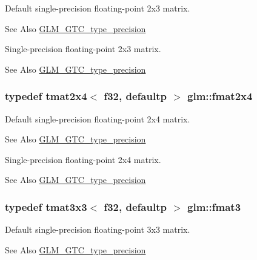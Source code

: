 Default single-\/precision floating-\/point 2x3 matrix. \begin{DoxySeeAlso}{See Also}
\hyperlink{group__gtc__type__precision}{G\-L\-M\-\_\-\-G\-T\-C\-\_\-type\-\_\-precision}
\end{DoxySeeAlso}
Single-\/precision floating-\/point 2x3 matrix. \begin{DoxySeeAlso}{See Also}
\hyperlink{group__gtc__type__precision}{G\-L\-M\-\_\-\-G\-T\-C\-\_\-type\-\_\-precision} 
\end{DoxySeeAlso}
\hypertarget{group__gtc__type__precision_ga76578ee3c2d6de9b46d0efd1c7060b85}{
\subsubsection[{fmat2x4}]{\setlength{\rightskip}{0pt plus 5cm}typedef tmat2x4$<$ f32, defaultp $>$ {\bf glm\-::fmat2x4}}}\label{group__gtc__type__precision_ga76578ee3c2d6de9b46d0efd1c7060b85}
Default single-\/precision floating-\/point 2x4 matrix. \begin{DoxySeeAlso}{See Also}
\hyperlink{group__gtc__type__precision}{G\-L\-M\-\_\-\-G\-T\-C\-\_\-type\-\_\-precision}
\end{DoxySeeAlso}
Single-\/precision floating-\/point 2x4 matrix. \begin{DoxySeeAlso}{See Also}
\hyperlink{group__gtc__type__precision}{G\-L\-M\-\_\-\-G\-T\-C\-\_\-type\-\_\-precision} 
\end{DoxySeeAlso}
\hypertarget{group__gtc__type__precision_ga17dec8b2e3d19b235b0749b8ac9f2217}{
\subsubsection[{fmat3}]{\setlength{\rightskip}{0pt plus 5cm}typedef tmat3x3$<$ f32, defaultp $>$ {\bf glm\-::fmat3}}}\label{group__gtc__type__precision_ga17dec8b2e3d19b235b0749b8ac9f2217}
Default single-\/precision floating-\/point 3x3 matrix. \begin{DoxySeeAlso}{See Also}
\hyperlink{group__gtc__type__precision}{G\-L\-M\-\_\-\-G\-T\-C\-\_\-type\-\_\-precision}
\end{DoxySeeAlso}
